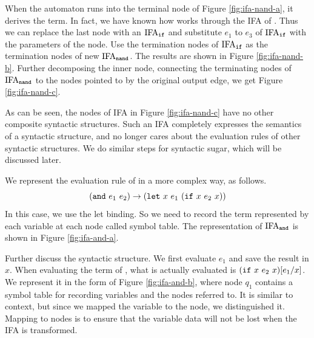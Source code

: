 \begin{example}
When the automaton runs into the terminal node of Figure \ref{fig:ifa-nand-a}, it derives the  term. In fact, we have known how  works through the IFA of . Thus we can replace the last node with an $\text{IFA}_{\mbox{\tt \scriptsize if}}$ and substitute $e_1$ to $e_3$ of $\text{IFA}_{\mbox{\tt \scriptsize if}}$ with the parameters of the node. Use the termination nodes of $\text{IFA}_{\mbox{\tt \scriptsize if}}$ as the termination nodes of new $\text{IFA}_{\mbox{\tt \scriptsize \scriptsize nand}}$. The results are shown in Figure \ref{fig:ifa-nand-b}. Further decomposing the inner  node, connecting the terminating nodes of $\text{IFA}_{\mbox{\tt \scriptsize nand}}$ to the nodes pointed to by the original output edge, we get Figure \ref{fig:ifa-nand-c}.

As can be seen, the nodes of IFA in Figure \ref{fig:ifa-nand-c} have no other composite syntactic structures. Such an IFA completely expresses the semantics of a syntactic structure, and no longer cares about the evaluation rules of other syntactic structures. We do similar steps for syntactic sugar, which will be discussed later.
\myend
\end{example}

\begin{example}

We represent the evaluation rule of  in a more complex way, as follows.
\[
    (\mbox{\tt and}~e_1~e_2) \to (\mbox{\tt let}~x~e_1~(\mbox{\tt if}~x~e_2~x))
\]
In this case, we use the let binding. So we need to record the term represented by each variable at each node called symbol table. The representation of $\text{IFA}_{\mbox{\tt \scriptsize and}}$ is shown in Figure \ref{fig:ifa-and-a}.

Further discuss the syntactic structure. We first evaluate $e_1$ and save the result in $x$. When evaluating the term of , what is actually evaluated is $(\mbox{\tt if}~x~e_2~x)[e_1/x]$. We represent it in the form of Figure \ref{fig:ifa-and-b}, where node $q_1$ contains a symbol table for recording variables and the nodes referred to. It is similar to context, but since we mapped the variable to the node, we distinguished it. Mapping to nodes is to ensure that the variable data will not be lost when the IFA is transformed.
\myend
\end{example}


